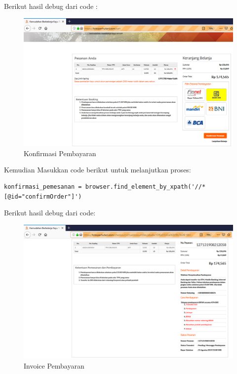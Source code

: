 Berikut hasil debug dari code :
\begin{figure}[h]
 	\centering
 	\includegraphics[scale=0.26]{figures/bayar}
 	\caption{Konfirmasi Pembayaran}
\end{figure}
 
Kemudian Masukkan code berikut untuk melanjutkan proses:
\begin{verbatim}
konfirmasi_pemesanan = browser.find_element_by_xpath('//*
[@id="confirmOrder"]')
\end{verbatim}
Berikut hasil debug dari code: 
\begin{figure}[h]
	\centering
	\includegraphics[scale=0.25]{figures/invoicee}
	\caption{Invoice Pembayaran}
\end{figure}

